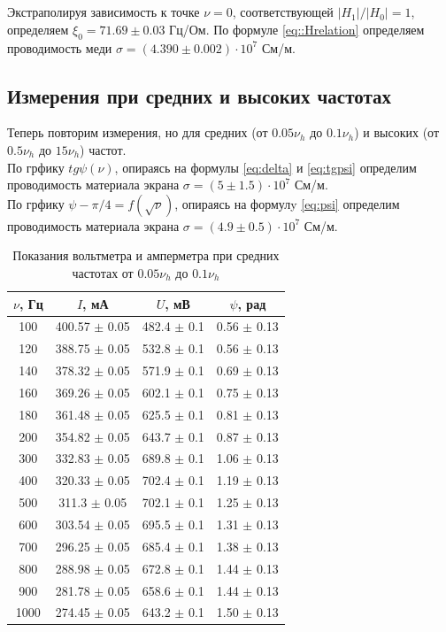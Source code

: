 \\\\
Экстраполируя зависимость к точке $\nu = 0$, соответствующей $|H_1|/|H_0| = 1$, определяем $\xi_0 = 71.69\pm0.03$ Гц/Ом. По формуле \ref{eq::Hrelation} определяем проводимость меди $\sigma = (4.390 \pm 0.002)\cdot10^7$ См/м.

\subsection*{Измерения при средних и высоких частотах}
\indent Теперь повторим измерения, но для средних (от $0.05\nu_h$ до $0.1\nu_h$) и высоких (от $0.5\nu_h$ до $15\nu_h$) частот.\\\indent По грфику $tg\psi(\nu)$, опираясь на формулы \ref{eq:delta} и \ref{eq:tgpsi} определим проводимость материала экрана $\sigma = (5\pm 1.5)\cdot 10^7$ См/м.\\\indent
По грфику $\psi - \pi/4 = f(\sqrt{\nu})$, опираясь на формулy \ref{eq:psi} определим проводимость материала экрана $\sigma = (4.9\pm 0.5)\cdot 10^7$ См/м.
\newpage
\begin{table}[h!]
    \centering
    \begin{tabular}{|c|c|c|c|}
        \hline
        $\nu$, Гц & $I$, мА & $U$, мВ & $\psi$, рад\\\hline
        100 & 400.57 $\pm$ 0.05 & 482.4 $\pm$ 0.1 & 0.56 $\pm$  0.13\\\hline
        120 & 388.75 $\pm$ 0.05 & 532.8 $\pm$ 0.1 & 0.56 $\pm$  0.13\\\hline
        140 & 378.32 $\pm$ 0.05 & 571.9 $\pm$ 0.1 & 0.69 $\pm$  0.13\\\hline
        160 & 369.26 $\pm$ 0.05 & 602.1 $\pm$ 0.1 & 0.75 $\pm$  0.13\\\hline
        180 & 361.48 $\pm$ 0.05 & 625.5 $\pm$ 0.1 & 0.81 $\pm$  0.13\\\hline
        200 & 354.82 $\pm$ 0.05 & 643.7 $\pm$ 0.1 & 0.87 $\pm$  0.13\\\hline
        300 & 332.83 $\pm$ 0.05 & 689.8 $\pm$ 0.1 & 1.06 $\pm$  0.13\\\hline
        400 & 320.33 $\pm$ 0.05 & 702.4 $\pm$ 0.1 & 1.19 $\pm$  0.13\\\hline
        500 & 311.3  $\pm$ 0.05 & 702.1 $\pm$ 0.1 & 1.25 $\pm$  0.13\\\hline
        600 & 303.54 $\pm$ 0.05 & 695.5 $\pm$ 0.1 & 1.31 $\pm$  0.13\\\hline
        700 & 296.25 $\pm$ 0.05 & 685.4 $\pm$ 0.1 & 1.38 $\pm$  0.13\\\hline
        800 & 288.98 $\pm$ 0.05 & 672.8 $\pm$ 0.1 & 1.44 $\pm$  0.13\\\hline
        900 & 281.78 $\pm$ 0.05 & 658.6 $\pm$ 0.1 & 1.44 $\pm$  0.13\\\hline
        1000& 274.45 $\pm$ 0.05 & 643.2 $\pm$ 0.1 & 1.50 $\pm$  0.13\\\hline
    \end{tabular}
    \caption{Показания вольтметра и амперметра при средних частотах от $0.05\nu_h$ до $0.1\nu_h$}
\end{table}

